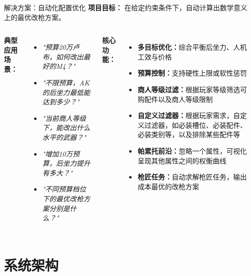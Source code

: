 \documentclass[aspectratio=169]{beamer}
\begin{document}
\begin{frame}{解决方案：自动化配置优化}
    \textbf{项目目标：}
    在给定约束条件下，自动计算出数学意义上的最优改枪方案。

    \vspace{0.4cm}
    \begin{columns}
        \textbf{典型应用场景：}
        \begin{itemize}
            \item \textit{"预算20万卢布，如何改出最好的M4？"}
            \item \textit{"不限预算，AK的后坐力最低能达到多少？"}
            \item \textit{"当前商人等级下，能改出什么水平的武器？"}
            \item \textit{"增加10万预算，后坐力提升有多大？"}
            \item \textit{"不同预算档位下的最优改枪方案分别是什么？"}
        \end{itemize}

        \textbf{核心功能：}
        \begin{itemize}
            \item \textbf{多目标优化：}综合平衡后坐力、人机工效与价格
            \item \textbf{预算控制：}支持硬性上限或软性惩罚
            \item \textbf{商人等级过滤：}根据玩家等级筛选可购配件以及商人等级限制
            \item \textbf{自定义过滤器：}根据玩家需求，自定义过滤器，如必装槽位、必装配件、必装类别等，以及排除某些配件等
            \item \textbf{帕累托前沿：}忽略一个属性，可视化呈现其他属性之间的权衡曲线
            \item \textbf{枪匠任务：}自动求解枪匠任务，输出成本最优的改枪方案
        \end{itemize}
    \end{columns}
\end{frame}

\section{系统架构}
\end{document}
